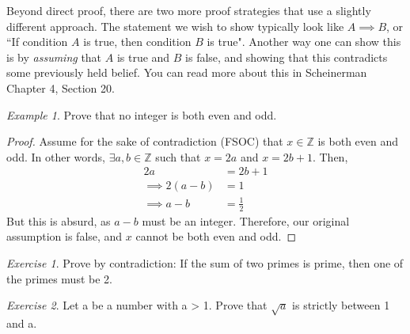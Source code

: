 \documentclass[11pt]{article}
\newcommand{\Z}{\ensuremath{\mathbb Z}}
\theoremstyle{plain}
\theoremstyle{definition}
\theoremstyle{remark}
\newtheorem{exm}{Example}[section]
\newtheorem{exc}{Exercise}[section]
\begin{document}
Beyond direct proof, there are two more proof strategies that use a slightly different approach. The statement we wish to show typically look like $A \implies B$, or ``If condition $A$ is true, then condition $B$ is true". Another way one can show this is by {\it assuming} that $A$ is true and $B$ is false, and showing that this contradicts some previously held belief. You can read more about this in Scheinerman Chapter 4, Section 20.
\begin{exm}
    Prove that no integer is both even and odd.
\end{exm}
\begin{proof}
    Assume for the sake of contradiction (FSOC) that $x \in \Z$ is both even and odd. In other words, $\exists a, b \in \Z$ such that $x = 2a$ and $x = 2b+1$. Then,
    \begin{align*}
        2a &= 2b+1\\
        \implies 2(a-b) &= 1\\
        \implies a-b &= \frac{1}{2}
    \end{align*}
    But this is absurd, as $a-b$ must be an integer. Therefore, our original assumption is false, and $x$ cannot be both even and odd.
\end{proof}
\begin{exc}
    Prove by contradiction: If the sum of two primes is prime, then one of the primes must be 2.
\end{exc}
\begin{exc}
    Let a be a number with a > 1. Prove that $\sqrt{a}$ is strictly between 1 and a.
\end{exc}
\end{document}
